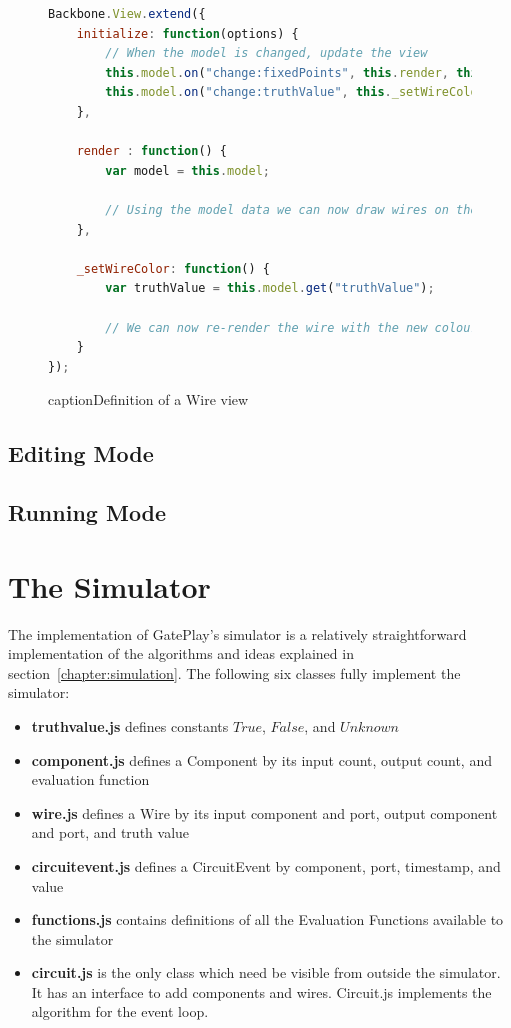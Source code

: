 \begin{figure}
\begin{lstlisting}[language=JavaScript]
Backbone.View.extend({
    initialize: function(options) {
        // When the model is changed, update the view
        this.model.on("change:fixedPoints", this.render, this);
        this.model.on("change:truthValue", this._setWireColor, this);
    },

    render : function() {
        var model = this.model;
		
		// Using the model data we can now draw wires on the canvas
    },

    _setWireColor: function() {
        var truthValue = this.model.get("truthValue");
        
        // We can now re-render the wire with the new colour
    }
});
\end{lstlisting}
caption{Definition of a Wire view}
\label{fig:wireview}
\end{figure}


\subsection{Editing Mode}


\subsection{Running Mode}

\section{The Simulator}
The implementation of GatePlay's simulator is a relatively straightforward implementation of the algorithms and ideas explained in section~\ref{chapter:simulation}. The following six classes fully implement the simulator:

\begin{itemize}
	\item \textbf{truthvalue.js} defines constants $True$, $False$, and $Unknown$
	\item \textbf{component.js} defines a Component by its input count, output count, and evaluation function
	\item \textbf{wire.js} defines a Wire by its input component and port, output component and port, and truth value
	\item \textbf{circuitevent.js} defines a CircuitEvent by component, port, timestamp, and value
	\item \textbf{functions.js} contains definitions of all the Evaluation Functions available to the simulator 
	\item \textbf{circuit.js} is the only class which need be visible from outside the simulator. It has an interface to add components and wires. Circuit.js implements the algorithm for the event loop. 
\end{itemize}

